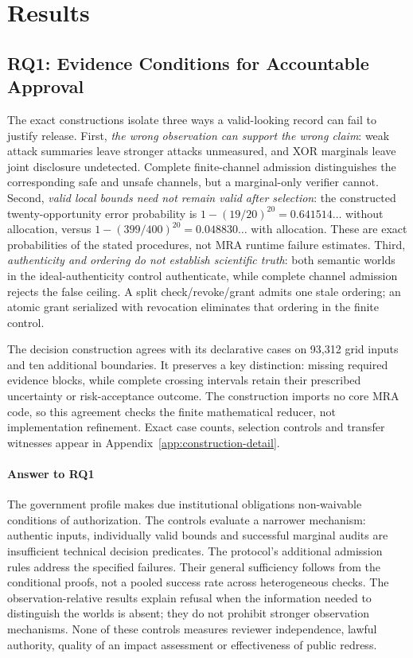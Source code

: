 \documentclass[conference,compsoc]{IEEEtran}
\begin{document}
\section{Results}
\label{sec:results}
\subsection{RQ1: Evidence Conditions for Accountable Approval}
\label{sec:gap-study}
\GapConstructionTable
The exact constructions isolate three ways a valid-looking record can fail
to justify release. First, \emph{the wrong observation can support the wrong
claim}: weak attack summaries leave stronger attacks unmeasured, and XOR
marginals leave joint disclosure undetected. Complete finite-channel
admission distinguishes the corresponding safe and unsafe channels, but a
marginal-only verifier cannot. Second, \emph{valid local bounds need not
remain valid after selection}: the constructed twenty-opportunity error
probability is $1-(19/20)^{20}=0.641514\ldots$ without allocation, versus
$1-(399/400)^{20}=0.048830\ldots$ with allocation. These are exact
probabilities of the stated procedures, not MRA runtime failure estimates.
Third, \emph{authenticity and ordering do not establish scientific truth}:
both semantic worlds in the ideal-authenticity control authenticate, while
complete channel admission rejects the false ceiling. A split
check/revoke/grant admits one stale ordering; an atomic grant serialized
with revocation eliminates that ordering in the finite control.

The decision construction agrees with its declarative cases on 93,312 grid
inputs and ten additional boundaries. It preserves a key distinction:
missing required evidence blocks, while complete crossing intervals retain
their prescribed uncertainty or risk-acceptance outcome. The construction
imports no core MRA code, so this agreement checks the finite mathematical
reducer, not implementation refinement. Exact case counts, selection
controls and transfer witnesses appear in
Appendix~\ref{app:construction-detail}.

\paragraph{Answer to RQ1}
The government profile makes due institutional obligations non-waivable
conditions of authorization. The controls evaluate a narrower mechanism:
authentic inputs, individually valid bounds and successful marginal audits
are insufficient technical decision predicates. The
protocol's additional admission rules address the specified failures.
Their general sufficiency follows from the conditional proofs, not a
pooled success rate across heterogeneous checks. The observation-relative
results explain refusal when the information needed to distinguish the
worlds is absent; they do not prohibit stronger observation mechanisms.
None of these controls measures reviewer independence, lawful authority,
quality of an impact assessment or effectiveness of public redress.
\end{document}
